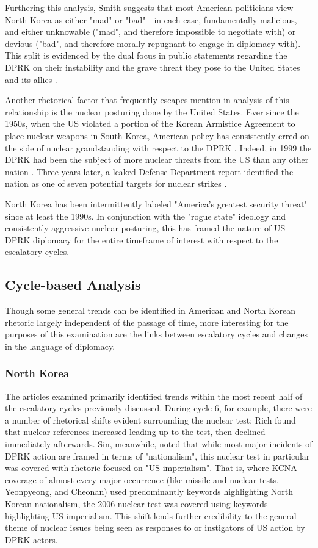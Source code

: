 \documentclass{article}
\begin{document}
Furthering this analysis, Smith \cite{smith} suggests that most American politicians view North Korea as either "mad" or "bad" - in each case, fundamentally malicious, and either unknowable ("mad", and therefore impossible to negotiate with) or devious ("bad", and therefore morally repugnant to engage in diplomacy with). This split is evidenced by the dual focus in public statements regarding the DPRK on their instability and the grave threat they pose to the United States and its allies \cite{smith}. 

Another rhetorical factor that frequently escapes mention in analysis of this relationship is the nuclear posturing done by the United States. Ever since the 1950s, when the US violated a portion of the Korean Armistice Agreement to place nuclear weapons in South Korea, American policy has consistently erred on the side of nuclear grandstanding with respect to the DPRK \cite{cumings}. Indeed, in 1999 the DPRK had been the subject of more nuclear threats from the US than any other nation \cite{sigal}. Three years later, a leaked Defense Department report identified the nation as one of seven potential targets for nuclear strikes \cite{harnisch}.

North Korea has been intermittently labeled "America's greatest security threat"\cite{cumings} since at least the 1990s. In conjunction with the "rogue state" ideology and consistently aggressive nuclear posturing, this has framed the nature of US-DPRK diplomacy for the entire timeframe of interest with respect to the escalatory cycles.

\subsection{Cycle-based Analysis}
Though some general trends can be identified in American and North Korean rhetoric largely independent of the passage of time, more interesting for the purposes of this examination are the links between escalatory cycles and changes in the language of diplomacy. 

\subsubsection{North Korea}

The articles examined primarily identified trends within the most recent half of the escalatory cycles previously discussed. During cycle 6, for example, there were a number of rhetorical shifts evident surrounding the nuclear test: Rich found that nuclear references increased leading up to the test, then declined immediately afterwards\cite{rich14}. Sin, meanwhile, noted that while most major incidents of DPRK action are framed in terms of "nationalism", this nuclear test in particular was covered with rhetoric focused on "US imperialism"\cite{sin}. That is, where KCNA coverage of almost every major occurrence (like missile and nuclear tests, Yeonpyeong, and Cheonan) used predominantly keywords highlighting North Korean nationalism, the 2006 nuclear test was covered using keywords highlighting US imperialism. This shift lends further credibility to the general theme of nuclear issues being seen as responses to or instigators of US action by DPRK actors.
\end{document}
